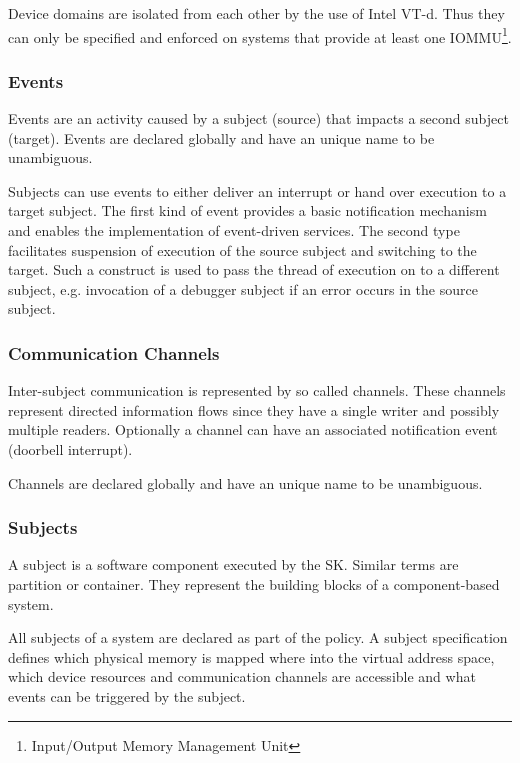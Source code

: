 \documentclass[a4paper,twoside,titlepage]{article}
\begin{document}
Device domains are isolated from each other by the use of Intel VT-d. Thus they
can only be specified and enforced on systems that provide at least one
IOMMU\footnote{Input/Output Memory Management Unit}.

\subsubsection{Events}
Events are an activity caused by a subject (source) that impacts a second
subject (target). Events are declared globally and have an unique name to be
unambiguous.

Subjects can use events to either deliver an interrupt or hand over execution to
a target subject. The first kind of event provides a basic notification
mechanism and enables the implementation of event-driven services. The second
type facilitates suspension of execution of the source subject and switching to
the target. Such a construct is used to pass the thread of execution on to a
different subject, e.g. invocation of a debugger subject if an error occurs in
the source subject.

\subsubsection{Communication Channels}
Inter-subject communication is represented by so called channels. These channels
represent directed information flows since they have a single writer and
possibly multiple readers. Optionally a channel can have an associated
notification event (doorbell interrupt).

Channels are declared globally and have an unique name to be unambiguous.


\subsubsection{Subjects}
A subject is a software component executed by the SK. Similar terms are
partition or container. They represent the building blocks of a component-based
system.

All subjects of a system are declared as part of the policy. A subject
specification defines which physical memory is mapped where into the virtual
address space, which device resources and communication channels are accessible
and what events can be triggered by the subject.
\end{document}
